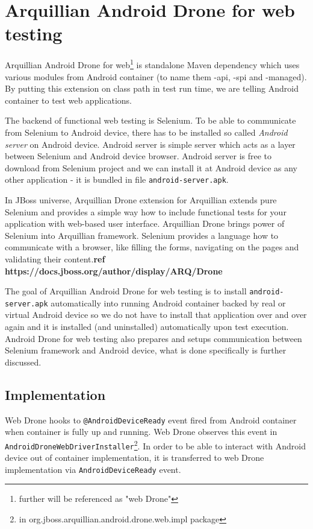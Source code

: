 \documentclass[12pt,final,oneside]{fithesis}
\begin{document}
	\section{Arquillian Android Drone for web testing}

Arquillian Android Drone for web\footnote{further will be referenced as "web Drone"} is standalone Maven dependency which uses various modules from Android container (to name them -api, -spi and -managed). By putting this extension on class path in test run time, we are telling Android container to test web applications.

The backend of functional web testing is Selenium. To be able to communicate from Selenium to Android device, there has to be installed so called \textit{Android server} on Android device. Android server is simple server which acts as a layer between Selenium and Android device browser. Android server is free to download from Selenium project and we can install it at Android device as any other application - it is bundled in file \texttt{android-server.apk}.

In JBoss universe, Arquillian Drone extension for Arquillian extends pure Selenium and provides a simple way how to include functional tests for your application with web-based user interface. Arquillian Drone brings power of Selenium into Arquillian framework. Selenium provides a language how to communicate with a browser, like filling the forms, navigating on the pages and validating their content.\textbf{ref https://docs.jboss.org/author/display/ARQ/Drone}

The goal of Arquillian Android Drone for web testing is to install \texttt{android-server.apk} automatically into running Android container backed by real or virtual Android device so we do not have to install that application over and over again and it is installed (and uninstalled) automatically upon test execution. Android Drone for web testing also prepares and setups communication between Selenium framework and Android device, what is done specifically is further discussed.

	\subsection{Implementation}

Web Drone hooks to \texttt{@AndroidDeviceReady} event fired from Android container when container is fully up and running. Web Drone observes this event in \texttt{AndroidDroneWebDriverInstaller}\footnote{in org.jboss.arquillian.android.drone.web.impl package}. In order to be able to interact with Android device out of container implementation, it is transferred to web Drone implementation via \texttt{AndroidDeviceReady} event.
\end{document}
